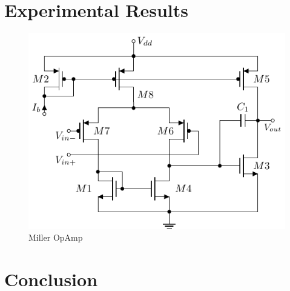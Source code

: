 \documentclass[conference]{IEEEtran}
\begin{document}
	
	
	\section{Experimental Results} \label{sec:results}
	\begin{figure}[]
		\centering
		\includegraphics[width=.7\linewidth]{figures/miller_pmos}
		\caption{Miller OpAmp}
		\label{fig:miller}
	\end{figure}
	
	
\section{Conclusion}
	



\end{document}
